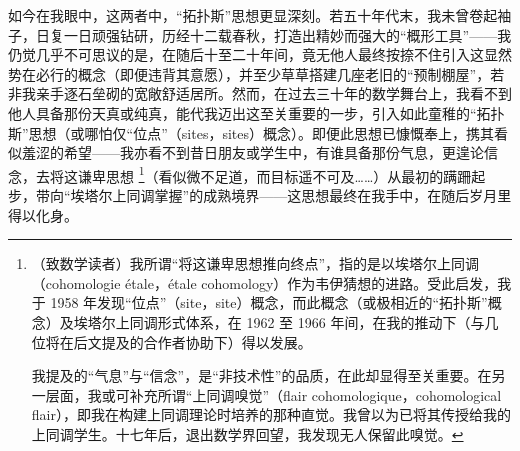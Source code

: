 如今在我眼中，这两者中，“拓扑斯”思想更显深刻。若五十年代末，我未曾卷起袖子，日复一日顽强钻研，历经十二载春秋，打造出精妙而强大的“概形工具”——我仍觉几乎不可思议的是，在随后十至二十年间，竟无他人最终按捺不住引入这显然势在必行的概念（即便违背其意愿），并至少草草搭建几座老旧的“预制棚屋”，若非我亲手逐石垒砌的宽敞舒适居所。然而，在过去三十年的数学舞台上，我看不到他人具备那份天真或纯真，能代我迈出这至关重要的一步，引入如此童稚的“拓扑斯”思想（或哪怕仅“位点”（sites，sites）概念）。即便此思想已慷慨奉上，携其看似羞涩的希望——我亦看不到昔日朋友或学生中，有谁具备那份气息，更遑论信念，去将这谦卑思想 \footnote{（致数学读者）我所谓“将这谦卑思想推向终点”，指的是以埃塔尔上同调（cohomologie étale，étale cohomology）作为韦伊猜想的进路。受此启发，我于 1958 年发现“位点”（site，site）概念，而此概念（或极相近的“拓扑斯”概念）及埃塔尔上同调形式体系，在 1962 至 1966 年间，在我的推动下（与几位将在后文提及的合作者协助下）得以发展。

我提及的“气息”与“信念”，是“非技术性”的品质，在此却显得至关重要。在另一层面，我或可补充所谓“上同调嗅觉”（flair cohomologique，cohomological flair），即我在构建上同调理论时培养的那种直觉。我曾以为已将其传授给我的上同调学生。十七年后，退出数学界回望，我发现无人保留此嗅觉。}（看似微不足道，而目标遥不可及……）从最初的蹒跚起步，带向“埃塔尔上同调掌握”的成熟境界——这思想最终在我手中，在随后岁月里得以化身。